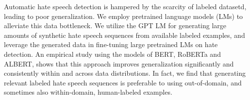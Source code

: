 Automatic hate speech detection is hampered by the scarcity of labeled datasetd, leading to poor generalization. We employ pretrained language models (LMs) to alleviate this data bottleneck. We utilize the GPT LM for generating large amounts of synthetic hate speech sequences from available labeled examples, and leverage the generated data in fine-tuning large pretrained LMs on hate detection. An empirical study using the models of BERT, RoBERTa and ALBERT, shows that this approach improves generalization significantly and consistently within and across data distributions. In fact, we find that generating relevant labeled hate speech sequences is preferable to using out-of-domain, and sometimes also within-domain, human-labeled examples.
